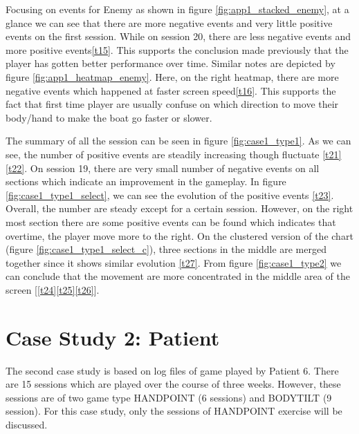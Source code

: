 Focusing on events for Enemy as shown in figure \ref{fig:app1_stacked_enemy}, at a glance we can see that there are more negative events and very little positive events on the first session. While on session 20, there are less negative events and more positive events\ref{t15}. This supports the conclusion made previously that the player has gotten better performance over time. Similar notes are depicted by figure \ref{fig:app1_heatmap_enemy}. Here, on the right heatmap, there are more negative events which happened at faster screen speed\ref{t16}. This supports the fact that first time player are usually confuse on which direction to move their body/hand to make the boat go faster or slower.

The summary of all the session can be seen in figure \ref{fig:case1_type1}. As we can see, the number of positive events are steadily increasing though fluctuate \ref{t21}\ref{t22}. On session 19, there are very small number of negative events on all sections which indicate an improvement in the gameplay. In figure \ref{fig:case1_type1_select}, we can see the evolution of the positive events \ref{t23}. Overall, the number are steady except for a certain session. However, on the right most section there are some positive events can be found which indicates that overtime, the player move more to the right. On the clustered version of the chart (figure \ref{fig:case1_type1_select_c}), three sections in the middle are merged together since it shows similar evolution \ref{t27}. From figure \ref{fig:case1_type2} we can conclude that the movement are more concentrated in the middle area of the screen [\ref{t24}\ref{t25}\ref{t26}].

\section{Case Study 2: Patient}
The second case study is based on log files of game played by Patient 6. There are 15 sessions which are played over the course of three weeks. However, these sessions are of two game type HANDPOINT (6 sessions) and BODYTILT (9 session). For this case study, only the sessions of HANDPOINT exercise will be discussed.



